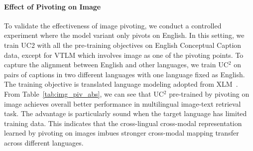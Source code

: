 \documentclass[final]{cvpr}
\newcommand{\ucabbr}{\textsc{UC$^2$} }
\begin{document}
\paragraph{Effect of Pivoting on Image}  To validate the effectiveness of image pivoting, we conduct a controlled experiment where the model variant only pivots on English. %
In this setting, we train UC2 with all the pre-training objectives on English Conceptual Caption data, except for VTLM which involves image as one of the pivoting points. To capture the alignment between English and other languages, we train \ucabbr on pairs of captions in two different languages with one language fixed as English. The training objective is translated language modeling adopted from XLM~\cite{lample2019cross}. %
From Table~\ref{tab:img_piv_abs}, we can see that \ucabbr pre-trained by pivoting on image achieves overall better performance in multilingual image-text retrieval task. The advantage is particularly sound when the target language has limited training data. This indicates that the cross-lingual cross-modal representation learned by pivoting on images imbues stronger cross-modal mapping transfer across different languages.

\end{document}
